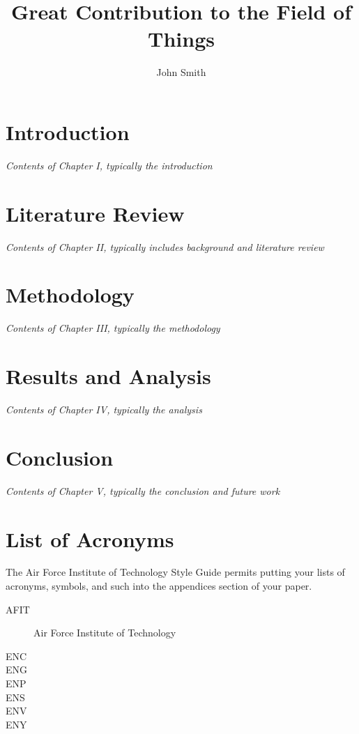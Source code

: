 \documentclass{afitthesis}
\title{Great Contribution to the Field of Things}
\author{John Smith}
\begin{document}
\maketitle %

\chapter{Introduction}

\emph{Contents of Chapter I, typically the introduction}

\chapter{Literature Review}

\emph{Contents of Chapter II, typically includes background and literature
review}

\chapter{Methodology}

\emph{Contents of Chapter III, typically the methodology}

\chapter{Results and Analysis}

\emph{Contents of Chapter IV, typically the analysis}

\chapter{Conclusion}

\emph{Contents of Chapter V, typically the conclusion and future work}

\appendix %

\chapter{List of Acronyms}

\def\afit{Air Force Institute of Technology}

The \afit{} Style Guide permits putting your lists of acronyms, symbols, and
such into the appendices section of your paper.
\begin{description}
    \item[AFIT] \afit
    \item[ENC] \ENC
    \item[ENG] \ENG
    \item[ENP] \ENP
    \item[ENS] \ENS
    \item[ENV] \ENV
    \item[ENY] \ENY
\end{description}
\end{document}
